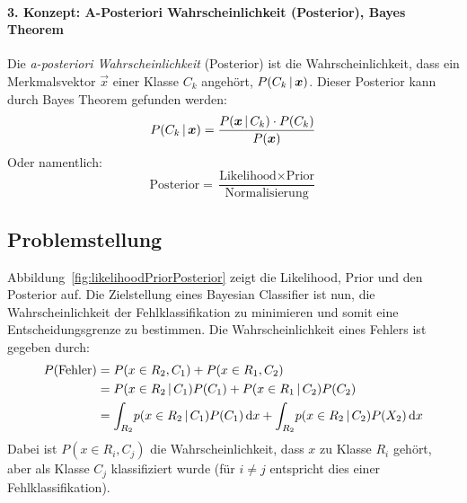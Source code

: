 			\paragraph{3. Konzept: A-Posteriori Wahrscheinlichkeit (Posterior), Bayes Theorem}
				Die \emph{a-posteriori Wahrscheinlichkeit} (Posterior) ist die Wahrscheinlichkeit, dass ein Merkmalsvektor \(\vec{x}\) einer Klasse \( C_k \) angehört, \dh \( P(C_k \,\vert\, \bm{x}) \). Dieser Posterior kann durch Bayes Theorem gefunden werden:
				\begin{equation*}
					P(C_k \,\vert\, \bm{x}) = \frac{P(\bm{x} \,\vert\, C_k) \cdot P(C_k)}{P(\bm{x})}
				\end{equation*}
				Oder namentlich:
				\begin{equation*}
					\text{Posterior} = \frac{\text{Likelihood} \times \text{Prior}}{\text{Normalisierung}}
				\end{equation*}

		\subsection{Problemstellung}
			Abbildung~\ref{fig:likelihoodPriorPosterior} zeigt die Likelihood, Prior und den Posterior auf. Die Zielstellung eines Bayesian Classifier ist nun, die Wahrscheinlichkeit der Fehlklassifikation zu minimieren und somit eine Entscheidungsgrenze zu bestimmen. Die Wahrscheinlichkeit eines Fehlers ist gegeben durch:
			\begin{align*}
				P(\text{Fehler}) &= P(x \in R_2, C_1) + P(x \in R_1, C_2) \\
					&= P(x \in R_2 \,\vert\, C_1) P(C_1) + P(x \in R_1 \,\vert\, C_2) P(C_2) \\
					&= \int_{R_2} \! p(x \in R_2 \,\vert\, C_1) P(C_1) \dd{x} + \int_{R_2} \! p(x \in R_2 \,\vert\, C_2) P(X_2) \dd{x}
			\end{align*}
			Dabei ist \( P(x \in R_i, C_j) \) die Wahrscheinlichkeit, dass \(x\) zu Klasse \(R_i\) gehört, aber als Klasse \(C_j\) klassifiziert wurde (für \( i \neq j \) entspricht dies einer Fehlklassifikation).

